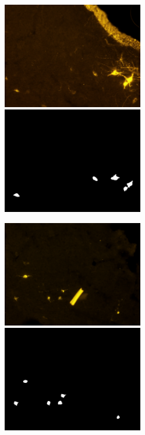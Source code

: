 \begin{figure}[ht]\ContinuedFloat
\centerline{
\includegraphics[width=0.55\textwidth]{figures/120_dataset/i_252.jpeg}
\includegraphics[width=0.55\textwidth]{figures/120_dataset/m_252.jpeg}
}
\centerline{
\includegraphics[width=0.55\textwidth]{figures/120_dataset/i_maccherone.jpeg}
\includegraphics[width=0.55\textwidth]{figures/120_dataset/m_maccherone.png}
}


\end{figure}
